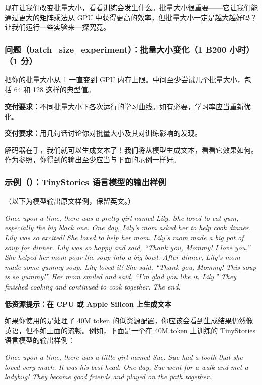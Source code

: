 现在让我们改变批量大小，看看训练会发生什么。批量大小很重要——它让我们能通过更大的矩阵乘法从 GPU 中获得更高的效率，但批量大小一定是越大越好吗？让我们运行一些实验来一探究竟。

\subsubsection*{问题（batch\_size\_experiment）：批量大小变化（1 B200 小时）（1 分）}

把你的批量大小从 1 一直变到 GPU 内存上限。中间至少尝试几个批量大小，包括 64 和 128 这样的典型值。

\textbf{交付要求：}不同批量大小下各次运行的学习曲线。如有必要，学习率应当重新优化。

\textbf{交付要求：}用几句话讨论你对批量大小及其对训练影响的发现。

解码器在手，我们就可以生成文本了！我们将从模型生成文本，看看它效果如何。作为参照，你得到的输出至少应当与下面的示例一样好。

\subsubsection*{示例（）：TinyStories 语言模型的输出样例}

（以下为模型输出原文样例，保留英文。）

\textit{Once upon a time, there was a pretty girl named Lily. She loved to eat gum, especially the big black one. One day, Lily's mom asked her to help cook dinner. Lily was so excited! She loved to help her mom. Lily's mom made a big pot of soup for dinner. Lily was so happy and said, ``Thank you, Mommy! I love you.'' She helped her mom pour the soup into a big bowl. After dinner, Lily's mom made some yummy soup. Lily loved it! She said, ``Thank you, Mommy! This soup is so yummy!'' Her mom smiled and said, ``I'm glad you like it, Lily.'' They finished cooking and continued to cook together. The end.}

\textbf{低资源提示：在 CPU 或 Apple Silicon 上生成文本}

如果你使用的是处理了 40M token 的低资源配置，你应该会看到生成结果仍然像英语，但不如上面的流畅。例如，下面是一个在 40M token 上训练的 TinyStories 语言模型的输出样例：

\textit{Once upon a time, there was a little girl named Sue. Sue had a tooth that she loved very much. It was his best head. One day, Sue went for a walk and met a ladybug! They became good friends and played on the path together.}

